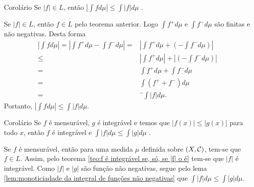 \begin{env}{Corolário}
	Se $|f| \in L$, então $\displaystyle \left|\int f d\mu\right| \leq \int |f| d\mu$ \cite{bartle}.
\end{env}
\begin{prova}
	Se $|f| \in L$, então $f \in L$ pelo teorema anterior.
	Logo $\int f^+ d\mu$ e $\int f^- d\mu$ são finitas e não negativas.
	Desta forma
	\begin{align*}
		\left|\int f d\mu \right|
		=
		\left|\int f^+ d\mu - \int f^- d\mu\right|
		= &
		\left|\int f^+ d\mu + \left(- \int f^- d\mu\right)\right|\\
		\leq&
		\left|\int f^+ d\mu\right| + \left|\left(- \int f^- d\mu\right)\right|\\
		=&
		\int f^+ d\mu + \int f^- d\mu\\
		= &
		\int (f^+ + f^-) d\mu\\
		=&¨
		\int |f| d\mu.
	\end{align*}
	Portanto, $\displaystyle \left|\int f d\mu \right| \leq  \int |f| d\mu.$
\end{prova}

\begin{env}{Corolário}
	\label{cor: f é mensurável, g é integrável então f é integrável}
	Se $f$ é mensurável, $g$ é integrável e temos que $|f(x)| \leq |g(x)|$ para todo $x$, então  $f$ é integrável e $\displaystyle \int |f| d\mu \leq \int |g| d\mu$ \cite{bartle}.
\end{env}
\begin{prova}
	Se $f$ é mensurável, então para uma medida $\mu$ definida sobre $(X,\operatorname{\mathcal{C}})$, tem-se que $f \in L$. Assim, pelo teorema \ref{teo:f é integrável se, só, se |f| o é} tem-se que $|f|$ é integrável.
	Como $|f|$ e $|g|$ são função não negativas, segue pelo lema
	\ref{lem:monoticiadade da integral de funções não negativas} que 
	$\displaystyle \int |f| d\mu \leq \int |g| d\mu$.
\end{prova}


